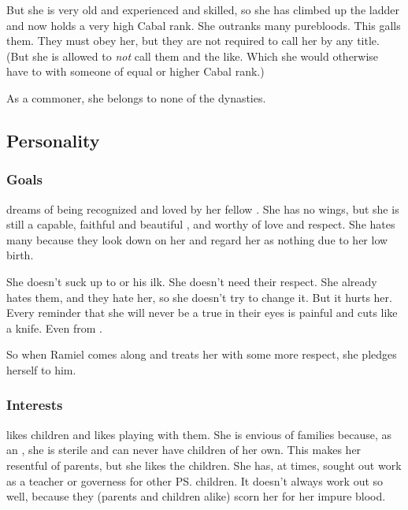 But she is very old and experienced and skilled, so she has climbed up the ladder and now holds a very high Cabal rank. 
She outranks many purebloods. 
This galls them. 
They must obey her, but they are not required to call her by any title. 
(But she is allowed to \emph{not} call them  and the like. Which she would otherwise have to with someone of equal or higher Cabal rank.)

As a commoner, she belongs to none of the \resphan{} dynasties. 









\subsection{Personality}





\subsubsection{Goals}
\Achsah{} dreams of being recognized and loved by her fellow \resphain. 
She has no wings, but she is still a capable, faithful and beautiful \resvil, and worthy of love and respect. 
She hates many \resphain{} because they look down on her and regard her as nothing due to her low birth. 

She doesn't suck up to \Teshrial{} or his ilk. 
She doesn't need their respect. 
She already hates them, and they hate her, so she doesn't try to change it. 
But it hurts her. 
Every reminder that she will never be a true \resvil{} in their eyes is painful and cuts like a knife. 
Even from \Teshrial. 

So when Ramiel comes along and treats her with some more respect, she pledges herself to him. 





\subsubsection{Interests}
\Achsah{} likes children and likes playing with them. 
She is envious of families because, as an \ashenblood, she is sterile and can never have children of her own. 
This makes her resentful of parents, but she likes the children. 
She has, at times, sought out work as a teacher or governess for other \ps{\resphain}{} children. 
It doesn't always work out so well, because they (parents and children alike) scorn her for her impure blood. 

